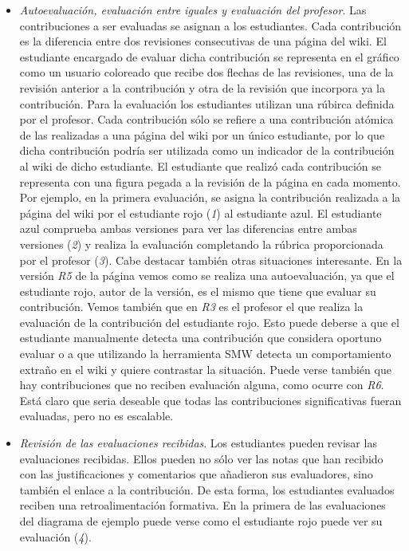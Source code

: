 \begin{itemize}
\item \emph{Autoevaluación, evaluación entre iguales y evaluación del profesor}. Las contribuciones a ser evaluadas se asignan a los estudiantes.  Cada contribución es la diferencia entre dos revisiones consecutivas de una página del wiki. El estudiante encargado de evaluar dicha contribución se representa en el gráfico como un usuario coloreado que recibe dos flechas de las revisiones, una de la revisión anterior a la contribución y otra de la revisión que incorpora ya la contribución. Para la evaluación los estudiantes utilizan una rúbirca definida por el profesor. Cada contribución sólo se refiere a una contribución atómica de las realizadas a una página del wiki por un único estudiante, por lo que dicha contribución podría ser utilizada como un indicador de la contribución al wiki de dicho estudiante. El estudiante que realizó cada contribución se representa con una figura pegada a la revisión de la página en cada momento.
Por ejemplo, en la primera evaluación, se asigna la contribución realizada a la página del wiki por el estudiante rojo (\emph{1}) al estudiante azul. El estudiante azul comprueba ambas versiones para ver las diferencias entre ambas versiones (\emph{2}) y realiza la evaluación completando la rúbrica proporcionada por el profesor (\emph{3}).
Cabe destacar también otras situaciones interesante. En la versión \emph{R5} de la página vemos como se realiza una autoevaluación, ya que el estudiante rojo, autor de la versión, es el mismo que tiene que evaluar su contribución. Vemos también que en \emph{R3} es el profesor el que realiza la evaluación de la contribución del estudiante rojo. Esto puede deberse a que el estudiante manualmente detecta una contribución que considera oportuno evaluar o a que utilizando la herramienta SMW detecta un comportamiento extraño en el wiki y quiere contrastar la situación. 
Puede verse también que hay contribuciones que no reciben evaluación alguna, como ocurre con \emph{R6}. Está claro que seria deseable que todas las contribuciones significativas fueran evaluadas, pero no es escalable.
\item \emph{Revisión de las evaluaciones recibidas}. Los estudiantes pueden revisar las evaluaciones recibidas. Ellos pueden no sólo ver las notas que han recibido con las justificaciones y comentarios que añadieron sus evaluadores, sino también el enlace a la contribución. De esta forma, los estudiantes evaluados reciben una retroalimentación formativa. En la primera de las evaluaciones del diagrama de ejemplo puede verse como el estudiante rojo puede ver su evaluación (\emph{4}).

\end{itemize}
